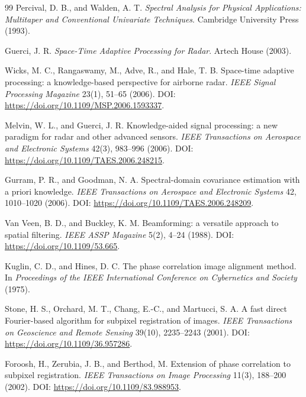 \documentclass[11pt]{article}
\begin{document}
\begin{thebibliography}{99}
Percival, D. B., and Walden, A. T.
\newblock \emph{Spectral Analysis for Physical Applications: Multitaper and Conventional Univariate Techniques}.
\newblock Cambridge University Press (1993).

Guerci, J. R.
\newblock \emph{Space-Time Adaptive Processing for Radar}.
\newblock Artech House (2003).

Wicks, M. C., Rangaswamy, M., Adve, R., and Hale, T. B.
\newblock Space-time adaptive processing: a knowledge-based perspective for airborne radar.
\newblock \emph{IEEE Signal Processing Magazine} 23(1), 51--65 (2006).
\newblock DOI: \url{https://doi.org/10.1109/MSP.2006.1593337}.

Melvin, W. L., and Guerci, J. R.
\newblock Knowledge-aided signal processing: a new paradigm for radar and other advanced sensors.
\newblock \emph{IEEE Transactions on Aerospace and Electronic Systems} 42(3), 983--996 (2006).
\newblock DOI: \url{https://doi.org/10.1109/TAES.2006.248215}.

Gurram, P. R., and Goodman, N. A.
\newblock Spectral-domain covariance estimation with a priori knowledge.
\newblock \emph{IEEE Transactions on Aerospace and Electronic Systems} 42, 1010--1020 (2006).
\newblock DOI: \url{https://doi.org/10.1109/TAES.2006.248209}.

Van Veen, B. D., and Buckley, K. M.
\newblock Beamforming: a versatile approach to spatial filtering.
\newblock \emph{IEEE ASSP Magazine} 5(2), 4--24 (1988).
\newblock DOI: \url{https://doi.org/10.1109/53.665}.

Kuglin, C. D., and Hines, D. C.
\newblock The phase correlation image alignment method.
\newblock In \emph{Proceedings of the IEEE International Conference on Cybernetics and Society} (1975).

Stone, H. S., Orchard, M. T., Chang, E.-C., and Martucci, S. A.
\newblock A fast direct Fourier-based algorithm for subpixel registration of images.
\newblock \emph{IEEE Transactions on Geoscience and Remote Sensing} 39(10), 2235--2243 (2001).
\newblock DOI: \url{https://doi.org/10.1109/36.957286}.

Foroosh, H., Zerubia, J. B., and Berthod, M.
\newblock Extension of phase correlation to subpixel registration.
\newblock \emph{IEEE Transactions on Image Processing} 11(3), 188--200 (2002).
\newblock DOI: \url{https://doi.org/10.1109/83.988953}.


\end{thebibliography}
\end{document}
